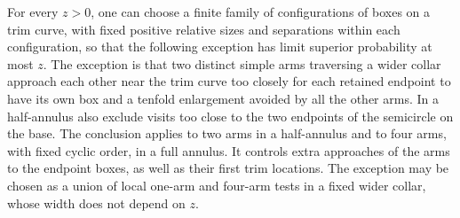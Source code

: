 \begin{lemma}\label{lem:trim-arms}
For every $z>0$, one can choose a finite family of configurations
of boxes on a trim curve, with fixed positive relative sizes
and separations within each configuration, so that the following
exception has limit superior probability at most $z$.
The exception is that two distinct simple arms traversing a
wider collar approach each other near the trim curve too closely
for each retained endpoint to have its own box and a tenfold
enlargement avoided by all the other arms.  In a half-annulus
also exclude visits too close to the two endpoints of the
semicircle on the base.  The conclusion applies to two arms in
a half-annulus and to four arms, with fixed cyclic order, in a
full annulus.  It controls extra approaches of the arms to the
endpoint boxes, as well as their first trim locations.  The
exception may be chosen as a union of local one-arm and four-arm
tests in a fixed wider collar, whose width does not depend on $z$.
\end{lemma}

